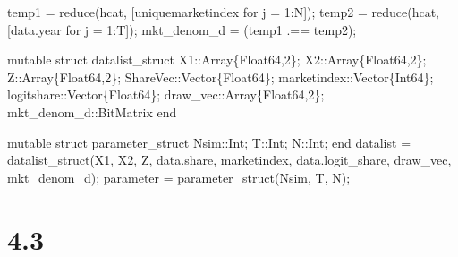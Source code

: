 \documentclass[
  letterpaper,
  DIV=11,
  numbers=noendperiod]{scrreprt}
\newenvironment{Shaded}{\begin{snugshade}}{\end{snugshade}}
\newcommand{\CharTok}[1]{\textcolor[rgb]{0.13,0.47,0.30}{#1}}
\newcommand{\DataTypeTok}[1]{\textcolor[rgb]{0.68,0.00,0.00}{#1}}
\newcommand{\FloatTok}[1]{\textcolor[rgb]{0.68,0.00,0.00}{#1}}
\newcommand{\FunctionTok}[1]{\textcolor[rgb]{0.28,0.35,0.67}{#1}}
\newcommand{\KeywordTok}[1]{\textcolor[rgb]{0.00,0.23,0.31}{#1}}
\newcommand{\NormalTok}[1]{\textcolor[rgb]{0.00,0.23,0.31}{#1}}
\newcommand{\OperatorTok}[1]{\textcolor[rgb]{0.37,0.37,0.37}{#1}}
\begin{document}
\begin{Shaded}
\begin{Highlighting}[]
\NormalTok{temp1 }\OperatorTok{=} \FunctionTok{reduce}\NormalTok{(hcat, [uniquemarketindex for j }\OperatorTok{=} \FloatTok{1}\OperatorTok{:}\NormalTok{N])}\CharTok{\textquotesingle{};}
\NormalTok{temp2 }\OperatorTok{=} \FunctionTok{reduce}\NormalTok{(hcat, [data.year for j }\OperatorTok{=} \FloatTok{1}\OperatorTok{:}\NormalTok{T]);}
\NormalTok{mkt\_denom\_d }\OperatorTok{=}\NormalTok{ (temp1 }\OperatorTok{.==}\NormalTok{ temp2);}

\KeywordTok{mutable struct}\NormalTok{ datalist\_struct}
\NormalTok{    X1}\OperatorTok{::}\DataTypeTok{Array\{Float64,2\}}\NormalTok{;}
\NormalTok{    X2}\OperatorTok{::}\DataTypeTok{Array\{Float64,2\}}\NormalTok{;}
\NormalTok{    Z}\OperatorTok{::}\DataTypeTok{Array\{Float64,2\}}\NormalTok{;}
\NormalTok{    ShareVec}\OperatorTok{::}\DataTypeTok{Vector\{Float64\}}\NormalTok{;}
\NormalTok{    marketindex}\OperatorTok{::}\DataTypeTok{Vector\{Int64\}}\NormalTok{;}
\NormalTok{    logitshare}\OperatorTok{::}\DataTypeTok{Vector\{Float64\}}\NormalTok{;}
\NormalTok{    draw\_vec}\OperatorTok{::}\DataTypeTok{Array\{Float64,2\}}\NormalTok{;}
\NormalTok{    mkt\_denom\_d}\OperatorTok{::}\DataTypeTok{BitMatrix}
\KeywordTok{end}

\KeywordTok{mutable struct}\NormalTok{ parameter\_struct}
\NormalTok{    Nsim}\OperatorTok{::}\DataTypeTok{Int}\NormalTok{;}
\NormalTok{    T}\OperatorTok{::}\DataTypeTok{Int}\NormalTok{;}
\NormalTok{    N}\OperatorTok{::}\DataTypeTok{Int}\NormalTok{;}
\KeywordTok{end}
\NormalTok{datalist }\OperatorTok{=} \FunctionTok{datalist\_struct}\NormalTok{(X1, X2, Z, data.share, marketindex, data.logit\_share, draw\_vec, mkt\_denom\_d);}
\NormalTok{parameter }\OperatorTok{=} \FunctionTok{parameter\_struct}\NormalTok{(Nsim, T, N);}
\end{Highlighting}
\end{Shaded}

\hypertarget{section-8}{%
\section{4.3}\label{section-8}}
\end{document}
